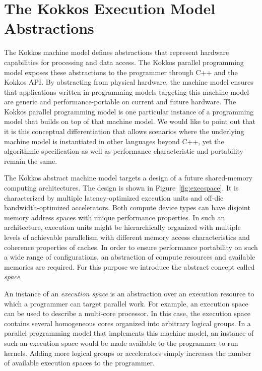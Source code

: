 
\section{The Kokkos Execution Model Abstractions}\label{chap:kokkosEMA}

The Kokkos machine model defines abstractions that represent hardware capabilities for processing and data access. The Kokkos parallel programming model exposes these abstractions to the programmer through C++ and the Kokkos API. By abstracting from physical hardware, the machine model ensures that applications written in programming models targeting this machine model are generic and performance-portable on current and future hardware. The Kokkos parallel programming model is one particular instance of a programming model that builds on top of that machine model. We would like to point out that it is this conceptual differentiation that allows scenarios where the underlying machine model is instantiated in other languages beyond C++, yet the algorithmic specification as well as performance characteristic and portability remain the same. 

The Kokkos abstract machine model targets a design of a future shared-memory computing architectures. The design is shown in Figure~\ref{fig:execspace}. It is characterized by multiple latency-optimized execution units and off-die bandwidth-optimized accelerators. Both compute device types can have disjoint memory address spaces with unique performance properties. In such an architecture, execution units might be hierarchically organized with multiple levels of achievable parallelism with different memory access characteristics and coherence properties of caches. In order to ensure performance portability on such a wide range of configurations, an abstraction of compute resources and available memories are required. For this purpose we introduce the abstract concept called \emph{space}.

An instance of an \emph{execution space} is an abstraction over an execution resource to which a programmer can target parallel work. For example, an execution space can be used to describe a multi-core processor. In this case, the execution space contains several homogeneous cores organized into arbitrary logical groups. In a parallel programming model that implements this machine model, an instance of such an execution space would be made available to the programmer to run kernels. Adding more logical groups or accelerators simply increases the number of available execution spaces to the programmer.

